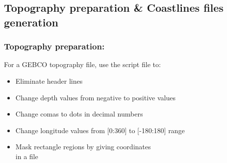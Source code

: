 \subsection{Topography preparation \& Coastlines files generation}

\begin{frame}
\frametitle{Topography preparation: }

\centerline{
 For a GEBCO topography file, use the script file  to:
}
\small{
\begin{itemize}
\item Eliminate header lines
\item Change depth values from negative to positive values
\item Change comas to dots in decimal numbers 
\item Change longitude values from $[$0:360$]$ to $[$-180:180$]$ range
\item Mask rectangle regions by giving coordinates \\
in a  file
\end{itemize}
}
\end{frame}



